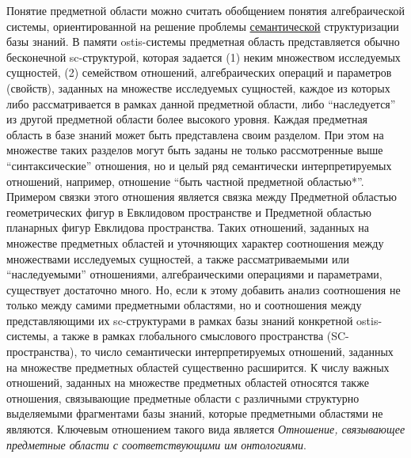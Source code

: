 \begin{SCn}
{Понятие предметной области можно считать обобщением понятия алгебраической системы, ориентированной на решение проблемы \uline{семантической} структуризации базы знаний. В памяти ostis-системы предметная область представляется обычно бесконечной sc-структурой, которая задается (1) неким множеством исследуемых сущностей, (2) семейством отношений, алгебраических операций и параметров (свойств), заданных на множестве исследуемых сущностей, каждое из которых либо рассматривается в рамках данной предметной области, либо ``наследуется'' из другой предметной области более высокого уровня. Каждая предметная область в базе знаний может быть представлена своим разделом. При этом на множестве таких разделов могут быть заданы не только рассмотренные выше ``синтаксические'' отношения, но и целый ряд семантически интерпретируемых отношений, например, отношение ``быть частной предметной областью*''. Примером связки этого отношения является связка между Предметной областью геометрических фигур в Евклидовом пространстве и Предметной областью планарных фигур Евклидова пространства. Таких отношений, заданных на множестве предметных областей и уточняющих характер соотношения между множествами исследуемых сущностей, а также рассматриваемыми или ``наследуемыми'' отношениями, алгебраическими операциями и параметрами, существует достаточно много. Но, если к этому добавить анализ соотношения не только между самими предметными областями, но и соотношения между представляющими их sc-структурами в рамках базы знаний конкретной ostis-системы, а также в рамках глобального смыслового пространства (SC-пространства), то число семантически интерпретируемых отношений, заданных на множестве предметных областей существенно расширится. К числу важных отношений, заданных на множестве предметных областей относятся также отношения, связывающие предметные области с различными структурно выделяемыми фрагментами базы знаний, которые предметными областями не являются. Ключевым отношением такого вида является \textit{Отношение, связывающее предметные области с соответствующими им онтологиями}.} 

\filemodetrue
{}
\filemodefalse


\end{SCn}
